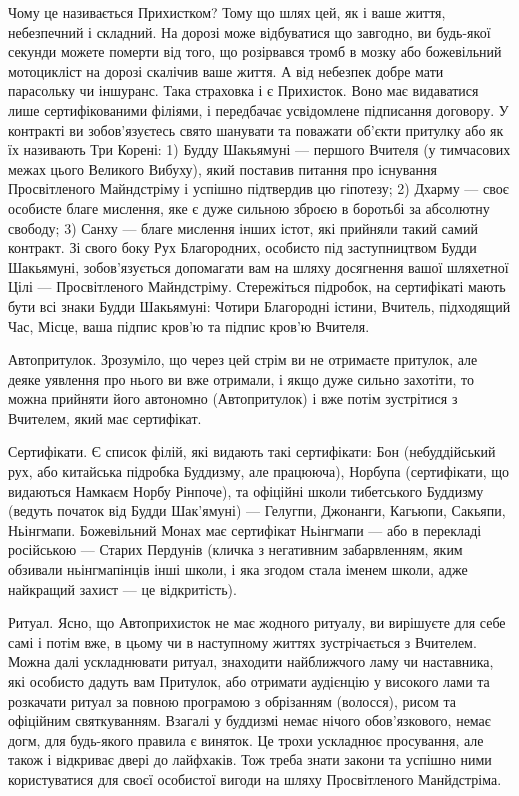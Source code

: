 Чому це називається Прихистком? Тому що шлях цей, як і
ваше життя, небезпечний і складний. На дорозі може відбуватися що
завгодно, ви будь-якої секунди можете померти від того, що розірвався
тромб в мозку або божевільний мотоцикліст на дорозі скалічив ваше життя.
А від небезпек добре мати парасольку чи іншуранс. Така страховка
і є Прихисток. Воно має видаватися лише сертифікованими
філіями, і передбачає усвідомлене підписання договору.
У контракті ви зобов'язуєтесь свято шанувати та поважати об'єкти
притулку або як їх називають Три Корені: 1) Будду Шакьямуні ---
першого Вчителя (у тимчасових межах цього Великого Вибуху), який
поставив питання про існування Просвітленого Майндстріму
і успішно підтвердив цю гіпотезу; 2) Дхарму --- своє особисте
благе мислення, яке є дуже сильною зброєю в
боротьбі за абсолютну свободу; 3) Санху --- благе мислення
інших істот, які прийняли такий самий контракт. Зі свого боку
Рух Благородних, особисто під заступництвом Будди Шакьямуні,
зобов'язується допомагати вам на шляху досягнення вашої шляхетної
Цілі --- Просвітленого Майндстріму. Стережіться підробок,
на сертифікаті мають бути всі знаки Будди Шакьямуні: Чотири
Благородні істини, Вчитель, підходящий Час, Місце, ваша
підпис кров'ю та підпис кров'ю Вчителя.

Автопритулок. Зрозуміло, що через цей стрім ви не отримаєте
притулок, але деяке уявлення про нього ви вже отримали,
і якщо дуже сильно захотіти, то можна прийняти його автономно
(Автопритулок) і вже потім зустрітися з Вчителем, який
має сертифікат.

Сертифікати. Є список філій, які видають такі сертифікати:
Бон (небуддійський рух, або китайська підробка Буддизму,
але працююча), Норбупа (сертифікати, що видаються Намкаєм Норбу
Рінпоче), та офіційні школи тибетського Буддизму (ведуть
початок від Будди Шак'ямуні) --- Гелугпи, Джонанги, Кагьюпи,
Сакьяпи, Ньінгмапи. Божевільний Монах має сертифікат Ньінгмапи
--- або в перекладі російською --- Старих Пердунів (кличка
з негативним забарвленням, яким обзивали ньінгмапінців
інші школи, і яка згодом стала іменем школи, адже найкращий захист --- це відкритість).

Ритуал. Ясно, що Автоприхисток не має жодного ритуалу,
ви вирішуєте для себе самі і потім вже, в цьому чи в наступному
життях зустрічається з Вчителем. Можна далі ускладнювати ритуал,
знаходити найближчого ламу чи наставника, які особисто дадуть
вам Притулок, або отримати аудієнцію у високого лами та
розкачати ритуал за повною програмою з обрізанням (волосся),
рисом та офіційним святкуванням. Взагалі у буддизмі немає
нічого обов'язкового, немає догм, для будь-якого правила є
виняток. Це трохи ускладнює просування, але також
і відкриває двері до лайфхаків. Тож треба знати закони
та успішно ними користуватися для своєї особистої вигоди на шляху
Просвітленого Манйдстріма.
